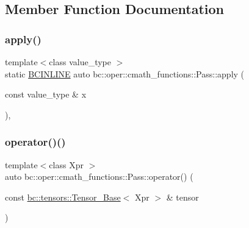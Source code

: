 \subsection{Member Function Documentation}
\mbox{\label{structbc_1_1oper_1_1cmath__functions_1_1Pass_a1b13fc225f6bb39d6d51b30878a3e16e}} 
\subsubsection{\texorpdfstring{apply()}{apply()}}
{\footnotesize\ttfamily template$<$class value\+\_\+type $>$ \\
static \hyperlink{common_8h_a6699e8b0449da5c0fafb878e59c1d4b1}{B\+C\+I\+N\+L\+I\+NE} auto bc\+::oper\+::cmath\+\_\+functions\+::\+Pass\+::apply (\begin{DoxyParamCaption}\item[{const value\+\_\+type \&}]{x }\end{DoxyParamCaption})\hspace{0.3cm}{\ttfamily [inline]}, {\ttfamily [static]}}

\mbox{\label{structbc_1_1oper_1_1cmath__functions_1_1Pass_a6ca72e94621958eb0ec2cd43062e98f3}} 
\subsubsection{\texorpdfstring{operator()()}{operator()()}\hspace{0.1cm}{\footnotesize\ttfamily [1/3]}}
{\footnotesize\ttfamily template$<$class Xpr $>$ \\
auto bc\+::oper\+::cmath\+\_\+functions\+::\+Pass\+::operator() (\begin{DoxyParamCaption}\item[{const \hyperlink{classbc_1_1tensors_1_1Tensor__Base}{bc\+::tensors\+::\+Tensor\+\_\+\+Base}$<$ Xpr $>$ \&}]{tensor }\end{DoxyParamCaption})\hspace{0.3cm}{\ttfamily [inline]}}


